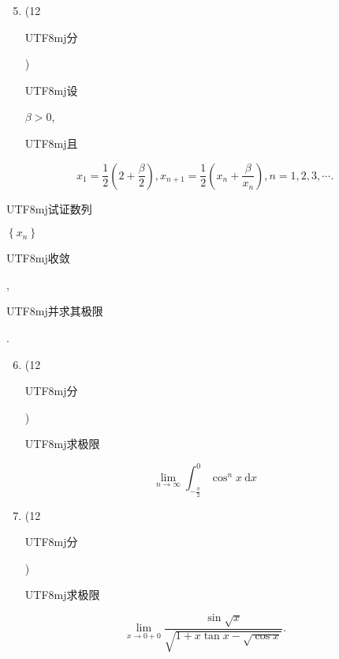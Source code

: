 \documentclass[10pt]{article}
\begin{document}
\begin{enumerate}
  \setcounter{enumi}{4}
  \item (12 \begin{CJK}{UTF8}{mj}分\end{CJK}) \begin{CJK}{UTF8}{mj}设\end{CJK} $\beta>0$, \begin{CJK}{UTF8}{mj}且\end{CJK}
\end{enumerate}
$$
x_{1}=\frac{1}{2}\left(2+\frac{\beta}{2}\right), x_{n+1}=\frac{1}{2}\left(x_{n}+\frac{\beta}{x_{n}}\right), n=1,2,3, \cdots .
$$
\begin{CJK}{UTF8}{mj}试证数列\end{CJK} $\left\{x_{n}\right\}$ \begin{CJK}{UTF8}{mj}收敛\end{CJK}, \begin{CJK}{UTF8}{mj}并求其极限\end{CJK}.

\begin{enumerate}
  \setcounter{enumi}{5}
  \item (12 \begin{CJK}{UTF8}{mj}分\end{CJK}) \begin{CJK}{UTF8}{mj}求极限\end{CJK}
\end{enumerate}
$$
\lim _{n \rightarrow \infty} \int_{-\frac{\pi}{2}}^{0} \cos ^{n} x \mathrm{~d} x
$$

\begin{enumerate}
  \setcounter{enumi}{6}
  \item (12 \begin{CJK}{UTF8}{mj}分\end{CJK}) \begin{CJK}{UTF8}{mj}求极限\end{CJK}
\end{enumerate}
$$
\lim _{x \rightarrow 0+0} \frac{\sin \sqrt{x}}{\sqrt{1+x \tan x-\sqrt{\cos x}}} .
$$
\end{document}
